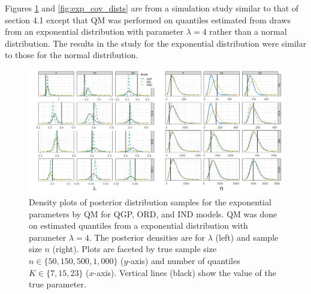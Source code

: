 \documentclass[preprint,12pt,authoryear]{elsarticle}
\begin{document}
Figures \ref{fig:exp_dens} and \ref{fig:exp_cov_dists} are from a simulation 
study similar to that of section 4.1 
except that QM was performed on
quantiles estimated from draws from an exponential distribution with 
parameter $\lambda = 4$ rather than a normal distribution. 
The results in the study for the exponential distribution were similar 
to those for the normal
distribution.


\begin{figure}
\centering
  \includegraphics[width = 1.1\linewidth]{Images/exp_params_fit.png}
\caption{Density plots of posterior distribution samples for the exponential 
parameters by QM for QGP,
ORD, and IND models. QM was done on estimated quantiles from a exponential 
distribution with parameter
$\lambda = 4$. The posterior densities are for $\lambda$
(left) and sample size $n$ (right). 
Plots are faceted by true sample
size $n \in \{50, 150, 500, 1,000\}$ ($y$-axis) and number of quantiles 
$K \in \{7, 15, 23\}$ 
($x$-axis). Vertical lines (black)
show the value of the true parameter.}
\label{fig:exp_dens}
\end{figure}
\end{document}
